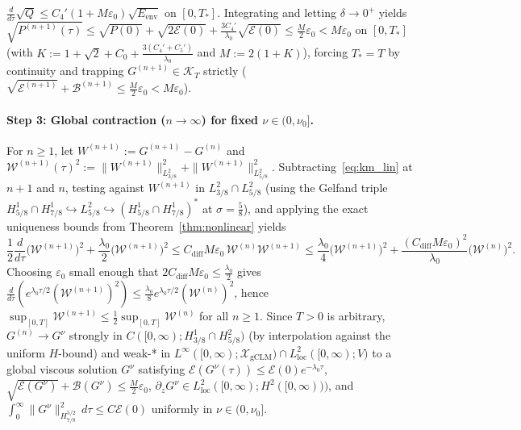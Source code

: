 \documentclass[11pt,a4paper]{article}
\begin{document}
$\frac{d}{d\tau}\sqrt{Q} \le C_4'(1+M\varepsilon_0)\sqrt{E_{\mathrm{env}}}$ on $[0,T_*]$. Integrating and letting $\delta \to 0^+$ yields $\sqrt{P^{(n+1)}(\tau)} \le \sqrt{P(0)} + \sqrt{2\mathcal{E}(0)} + \frac{3 C_4'}{\lambda_0}\sqrt{\mathcal{E}(0)} \le \frac{M}{2}\varepsilon_0 < M\varepsilon_0$ on $[0,T_*]$ (with $K := 1 + \sqrt{2} + C_0 + \frac{3(C_4'+C_5')}{\lambda_0}$ and $M := 2(1+K)$), forcing $T_* = T$ by continuity and trapping $G^{(n+1)} \in \mathcal{K}_T$ strictly ($\sqrt{\mathcal{E}^{(n+1)}} + \mathcal{B}^{(n+1)} \le \frac{M}{2}\varepsilon_0 < M\varepsilon_0$).

\paragraph{Step 3: Global contraction ($n \to \infty$) for fixed $\nu \in (0,\nu_0]$.}
For $n \ge 1$, let $W^{(n+1)} := G^{(n+1)} - G^{(n)}$ and $\mathcal{W}^{(n+1)}(\tau)^2 := \|W^{(n+1)}\|_{L^2_{3/8}}^2 + \|W^{(n+1)}\|_{L^2_{5/8}}^2$. Subtracting~\eqref{eq:km_lin} at $n+1$ and $n$, testing against $W^{(n+1)}$ in $L^2_{3/8}\cap L^2_{5/8}$ (using the Gelfand triple $H^1_{5/8}\cap H^1_{7/8} \hookrightarrow L^2_{5/8} \hookrightarrow (H^1_{5/8}\cap H^1_{7/8})^*$ at $\sigma = \frac{5}{8}$), and applying the exact uniqueness bounds from Theorem~\ref{thm:nonlinear} yields
\[
\frac{1}{2}\frac{d}{d\tau}\big(\mathcal{W}^{(n+1)}\big)^2 + \frac{\lambda_0}{2}\big(\mathcal{W}^{(n+1)}\big)^2 \le C_{\mathrm{diff}}M\varepsilon_0\,\mathcal{W}^{(n)}\mathcal{W}^{(n+1)} \le \frac{\lambda_0}{4}\big(\mathcal{W}^{(n+1)}\big)^2 + \frac{(C_{\mathrm{diff}}M\varepsilon_0)^2}{\lambda_0}\big(\mathcal{W}^{(n)}\big)^2.
\]
Choosing $\varepsilon_0$ small enough that $2 C_{\mathrm{diff}}M\varepsilon_0 \le \frac{\lambda_0}{2}$ gives $\frac{d}{d\tau}(e^{\lambda_0\tau/2}(\mathcal{W}^{(n+1)})^2) \le \frac{\lambda_0}{8}e^{\lambda_0\tau/2}(\mathcal{W}^{(n)})^2$, hence $\sup_{[0,T]}\mathcal{W}^{(n+1)} \le \frac{1}{2}\sup_{[0,T]}\mathcal{W}^{(n)}$ for all $n \ge 1$. Since $T > 0$ is arbitrary, $G^{(n)} \to G^\nu$ strongly in $C([0,\infty); H^1_{3/8}\cap H^2_{5/8})$ (by interpolation against the uniform $H$-bound) and weak-* in $L^\infty([0,\infty); \mathcal{X}_{\mathrm{gCLM}}) \cap L^2_{\mathrm{loc}}([0,\infty); V)$ to a global viscous solution $G^\nu$ satisfying $\mathcal{E}(G^\nu(\tau)) \le \mathcal{E}(0)e^{-\lambda_0\tau}$, $\sqrt{\mathcal{E}(G^\nu)} + \mathcal{B}(G^\nu) \le \frac{M}{2}\varepsilon_0$, $\partial_z G^\nu \in L^2_{\mathrm{loc}}([0,\infty); H^2([0,\infty)))$, and $\int_0^\infty \|G^\nu\|_{H^{5/2}_{7/8}}^2\,d\tau \le C\mathcal{E}(0)$ uniformly in $\nu \in (0,\nu_0]$.
\end{document}
